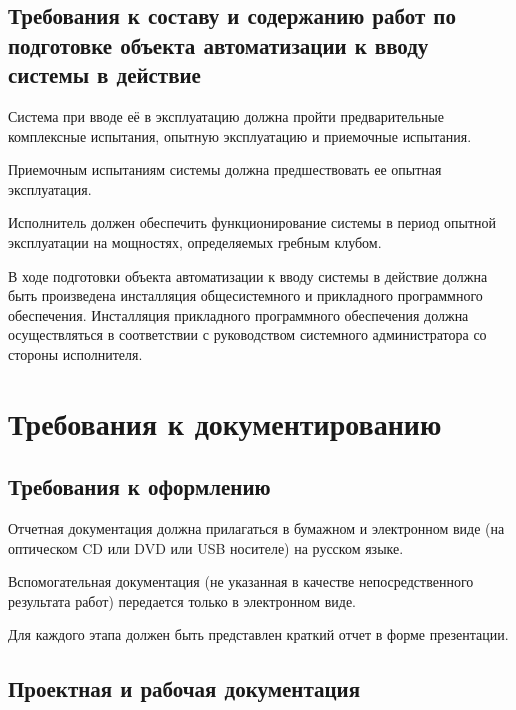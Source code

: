 \documentclass[14pt]{extreport}
\begin{document}
\section{Требования к составу и содержанию работ по подготовке объекта автоматизации к вводу системы в действие}

Система при вводе её в эксплуатацию должна пройти предварительные
комплексные испытания, опытную эксплуатацию и приемочные испытания.

Приемочным испытаниям системы должна предшествовать ее опытная
эксплуатация.

Исполнитель должен обеспечить функционирование системы в период
опытной эксплуатации на мощностях, определяемых гребным клубом.

В ходе подготовки объекта автоматизации к вводу системы в действие
должна быть произведена инсталляция общесистемного и прикладного программного
обеспечения. Инсталляция прикладного программного обеспечения должна
осуществляться в соответствии с руководством системного администратора со стороны исполнителя.

\chapter{Требования к документированию}

\section{Требования к оформлению}

Отчетная документация должна прилагаться в бумажном и электронном
виде (на оптическом CD или DVD или USB носителе) на русском языке.

Вспомогательная документация (не указанная в качестве непосредственного
результата работ) передается только в электронном виде.

Для каждого этапа должен быть представлен краткий отчет в форме
презентации.

\section{Проектная и рабочая документация}
\end{document}
